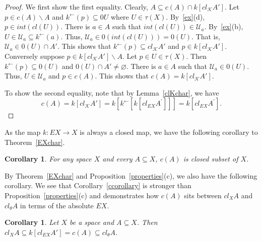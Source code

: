 \documentclass[11pt]{amsart}
\newif\ifdraft\draftfalse
\newtheorem{corollary}[theorem]{Corollary}
\theoremstyle{definition}
\theoremstyle{remark}
\numberwithin{equation}{section}
\begin{document}
\begin{proof} We first show the first equality. Clearly, $A \subseteq c(A) \cap k[cl_{{\ensuremath{\mathcal{K}}}}A']$.  Let $p \in c(A)\backslash A$ and $k^{\leftarrow}(p) \subseteq 0U$ where $U \in \tau(X)$.  By~\ref{ex}(d), $p \in int(cl(U))$.  There is $a \in A$ such that $int(cl(U)) \in{\ensuremath{\mathcal{{U}}}}_a$.  By~\ref{ex}(b), $U \in{\ensuremath{\mathcal{{U}}}}_a \subseteq k^{\leftarrow}(a)$.  Thus, ${\ensuremath{\mathcal{{U}}}}_a \in 0(int(cl(U))) = 0(U)$.  That is, ${\ensuremath{\mathcal{{U}}}}_a \in 0(U) \cap A'$.  This shows that $k^{\leftarrow}(p) \subseteq cl_{{\ensuremath{\mathcal{K}}}}A'$ and $p\in k[cl_{{\ensuremath{\mathcal{K}}}}A']$.  Conversely suppose $p\in k[cl_{{\ensuremath{\mathcal{K}}}}A']\backslash A$.  Let $p \in U \in \tau(X)$.  Then $k^{\leftarrow}(p) \subseteq 0(U)$ and $0(U) \cap A' \ne \varnothing$.  There is $a \in A$ such that ${\ensuremath{\mathcal{{U}}}}_a \in 0(U)$. Thus, $U \in{\ensuremath{\mathcal{{U}}}}_a$ and $p \in c(A)$. This shows that $c(A) = k[cl_{{\ensuremath{\mathcal{K}}}}A']$.

To show the second equality, note that by Lemma~\ref{clKchar}, we have
$$c(A)=k[cl_{{\ensuremath{\mathcal{K}}}}A']=k[k^{\leftarrow}[k[cl_{EX}A^\prime]]]= k[cl_{EX}A^\prime].$$
\end{proof}

As the map $k:EX\to X$ is always a closed map, we have the following corollary to Theorem~\ref{EXchar}.

\begin{corollary}
For any space $X$ and every $A{\subseteq} X$, $c(A)$ is closed subset of $X$.
\end{corollary}

By Theorem~\ref{EXchar} and Proposition~\ref{properties}(c), we also have the following corollary. We see that Corollary~\ref{ccorollary} is stronger than Proposition~\ref{properties}(c) and demonstrates how $c(A)$ sits between $cl_XA$ and $cl_\theta A$ in terms of the absolute $EX$.

\begin{corollary}{{\immediate{}}{\ifdraft\hspace{-\lastskip}\vadjust{\vspace{-1mm}\smash{\llap{{\tt {{ccorollary}}}\hspace{8mm}}}\vspace{1mm}}\fi}}
Let $X$ be a space and $A \subseteq X$. Then $cl_XA \subseteq k[cl_{EX}A']= c(A) \subseteq cl_{\theta}A$.
\end{corollary}
\end{document}
